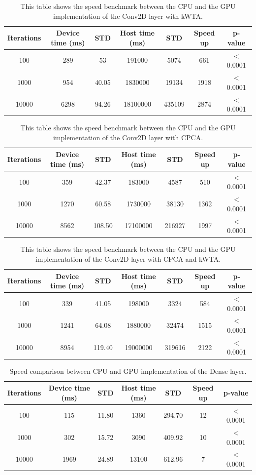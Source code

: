 \documentclass[11pt]{report}
\begin{document}
\begin{table}[h!]
\centering
\begin{tabular}{ c | c c | c c | c c }
Iterations & Device time (ms) & STD & Host time (ms) & STD & Speed up & p-value\\
\hline
100   & 289  & 53    & 191000   & 5074   & 661 & $<$ 0.0001 \\
1000  & 954  & 40.05 & 1830000  & 19134  & 1918 & $<$ 0.0001 \\
10000 & 6298 & 94.26 & 18100000 & 435109 & 2874 & $<$ 0.0001
\end{tabular}
\caption[Speed benchmark: Conv2D layer with kWTA]{This table shows the speed benchmark between the CPU and the GPU implementation of the Conv2D layer with kWTA.}
\end{table}

\begin{table}[h!]
\centering
\begin{tabular}{ c | c c | c c | c c }
Iterations & Device time (ms) & STD & Host time (ms) & STD & Speed up & p-value\\
\hline
100   & 359  & 42.37  & 183000   & 4587   & 510 & $<$ 0.0001 \\
1000  & 1270 & 60.58  & 1730000  & 38130  & 1362 & $<$ 0.0001 \\
10000 & 8562 & 108.50 & 17100000 & 216927 & 1997 & $<$ 0.0001
\end{tabular}
\caption[Speed benchmark: Conv2D layer with CPCA]{This table shows the speed benchmark between the CPU and the GPU implementation of the Conv2D layer with CPCA.}
\end{table}

\begin{table}[h!]
\centering
\begin{tabular}{ c | c c | c c | c c }
Iterations & Device time (ms) & STD & Host time (ms) & STD & Speed up & p-value\\
\hline
100   & 339  & 41.05  & 198000   & 3324   & 584 & $<$ 0.0001 \\
1000  & 1241 & 64.08  & 1880000  & 32474  & 1515 & $<$ 0.0001 \\
10000 & 8954 & 119.40 & 19000000 & 319616 & 2122 & $<$ 0.0001
\end{tabular}
\caption[Speed benchmark: Conv2D layer with CPCA and kWTA]{This table shows the speed benchmark between the CPU and the GPU implementation of the Conv2D layer with CPCA and kWTA.}
\end{table}

\begin{table}[h!]
\centering
\begin{tabular}{ c | c c | c c | c c }
Iterations & Device time (ms) & STD & Host time (ms) & STD & Speed up & p-value\\
\hline
100   & 115  & 11.80 & 1360  & 294.70 & 12 & $<$ 0.0001 \\
1000  & 302  & 15.72 & 3090  & 409.92 & 10 & $<$ 0.0001 \\
10000 & 1969 & 24.89 & 13100 & 612.96 & 7 & $<$ 0.0001
\end{tabular}
\caption[Speed benchmark: Dense layer]{Speed comparison between CPU and GPU implementation of the Dense layer.}
\label{tab:dense_res}
\end{table}
\end{document}
